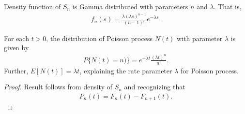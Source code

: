 \documentclass[a4paper,10pt,english]{article}
\begin{document}
\begin{thm} Density function of $S_n$ is Gamma distributed with parameters $n$ and $\lambda$. That is,
\begin{align*}
f_{n}(s) =\frac{\lambda (\lambda s)^{n-1}} {(n-1)!} e^{-\lambda s}.
\end{align*}
\end{thm}

\begin{thm} For each $t >0$, the distribution of Poisson process $N(t)$ with parameter $\lambda$ is given by
	\begin{align*}
	P\{N(t)=n)\}= e^{-\lambda t}\frac{(\lambda t)^{n}}{n!}.
	\end{align*}
Further, $E[N(t)] = \lambda t$, explaining the rate parameter $\lambda$ for Poisson process.
\end{thm}
\begin{proof}
Result follows from density of $S_n$ and recognizing that 
\begin{align*}
P_n(t) = F_n(t) - F_{n+1}(t).
\end{align*}
\end{proof}
\end{document}
